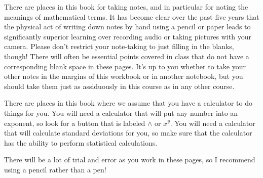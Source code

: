There are places in this book for taking notes, and in particular for noting the meanings of mathematical terms. It has become clear over the past five years that the physical act of writing down notes by hand using a pencil or paper leads to significantly superior learning over recording audio or taking pictures with your camera.
Please don't restrict your note-taking to just filling in the blanks, though!
There will often be essential points covered in class
that do not have a corresponding blank space in these pages.
It's up to you whether to take your other notes in the margins of this workbook or in another notebook,
but you should take them just as assiduously in this course as in any other course.

There are places in this book where we assume that you have a calculator to do things for you.  You will need a calculator that will put any number into an exponent, so look for a button that is labeled $\wedge$ or $x^y$.  You will need a calculator that will calculate standard deviations for you, so make sure that the calculator has the ability to perform statistical calculations.

There will be a lot of trial and error as you work in these pages,
so I recommend using a pencil rather than a pen!

